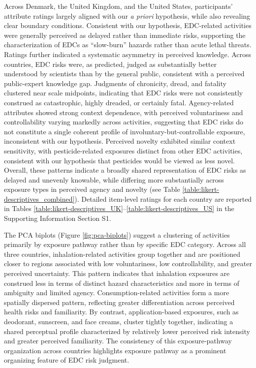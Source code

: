 

Across Denmark, the United Kingdom, and the United States, participants' attribute ratings largely aligned with our \emph{a priori} hypothesis, while also revealing clear boundary conditions. Consistent with our hypothesis, EDC-related activities were generally perceived as delayed rather than immediate risks, supporting the characterization of EDCs as “slow-burn” hazards rather than acute lethal threats. Ratings further indicated a systematic asymmetry in perceived knowledge. Across countries, EDC risks were, as predicted, judged as substantially better understood by scientists than by the general public, consistent with a perceived public-expert knowledge gap. Judgments of chronicity, dread, and fatality clustered near scale midpoints, indicating that EDC risks were not consistently construed as catastrophic, highly dreaded, or certainly fatal. Agency-related attributes showed strong context dependence, with perceived voluntariness and controllability varying markedly across activities, suggesting that EDC risks do not constitute a single coherent profile of involuntary-but-controllable exposure, inconsistent with our hypothesis. Perceived novelty exhibited similar context sensitivity, with pesticide-related exposures distinct from other EDC activities, consistent with our hypothesis that pesticides would be viewed as less novel. Overall, these patterns indicate a broadly shared representation of EDC risks as delayed and unevenly knowable, while differing more substantially across exposure types in perceived agency and novelty (see Table \ref{table:likert-descriptives_combined}). Detailed item-level ratings for each country are reported in Tables \ref{table:likert-descriptives_UK}--\ref{table:likert-descriptives_US} in the Supporting Information Section S1.



The PCA biplots (Figure \ref{fig:pca-biplots}) suggest a clustering of activities primarily by exposure pathway rather than by specific EDC category. Across all three countries, inhalation-related activities group together and are positioned closer to regions associated with low voluntariness, low controllability, and greater perceived uncertainty. This pattern indicates that inhalation exposures are construed less in terms of distinct hazard characteristics and more in terms of ambiguity and limited agency. Consumption-related activities form a more spatially dispersed pattern, reflecting greater differentiation across perceived health risks and familiarity. By contrast, application-based exposures, such as deodorant, sunscreen, and face creams, cluster tightly together, indicating a shared perceptual profile characterized by relatively lower perceived risk intensity and greater perceived familiarity. The consistency of this exposure-pathway organization across countries highlights exposure pathway as a prominent organizing feature of EDC risk judgment.

